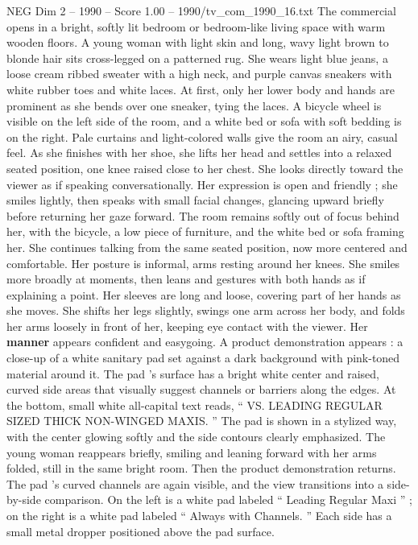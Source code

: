 \begin{textsample}{NEG Dim 2 – 1990 – Score 1.00 – 1990/tv\_com\_1990\_16.txt}  \label{ex:f2_neg_064}
The commercial opens in a bright, softly lit bedroom or bedroom-like living space with warm wooden floors.
A young woman with light skin and long, wavy light brown to blonde hair sits cross-legged on a patterned rug.
She wears light blue jeans, a loose cream ribbed sweater with a high neck, and purple canvas sneakers with white rubber toes and white laces.
At first, only her lower body and hands are prominent as she bends over one sneaker, tying the laces.
A bicycle wheel is visible on the left side of the room, and a white bed or sofa with soft bedding is on the right.
Pale curtains and light-colored walls give the room an airy, casual feel.
As she finishes with her shoe, she lifts her head and settles into a relaxed seated position, one knee raised close to her chest.
She looks directly toward the viewer as if speaking conversationally.
Her expression is open and friendly ; she smiles lightly, then speaks with small facial changes, glancing upward briefly before returning her gaze forward.
The room remains softly out of focus behind her, with the bicycle, a low piece of furniture, and the white bed or sofa framing her.
She continues talking from the same seated position, now more centered and comfortable.
Her posture is informal, arms resting around her knees.
She smiles more broadly at moments, then leans and gestures with both hands as if explaining a point.
Her sleeves are long and loose, covering part of her hands as she moves.
She shifts her legs slightly, swings one arm across her body, and folds her arms loosely in front of her, keeping eye contact with the viewer.
Her \textbf{manner} appears confident and easygoing.
A product demonstration appears : a close-up of a white sanitary pad set against a dark background with pink-toned material around it.
The pad ’s surface has a bright white center and raised, curved side areas that visually suggest channels or barriers along the edges.
At the bottom, small white all-capital text reads, “ VS.
LEADING REGULAR SIZED THICK NON-WINGED MAXIS. ” The pad is shown in a stylized way, with the center glowing softly and the side contours clearly emphasized.
The young woman reappears briefly, smiling and leaning forward with her arms folded, still in the same bright room.
Then the product demonstration returns.
The pad ’s curved channels are again visible, and the view transitions into a side-by-side comparison.
On the left is a white pad labeled “ Leading Regular Maxi ” ; on the right is a white pad labeled “ Always with Channels. ” Each side has a small metal dropper positioned above the pad surface.

\end{textsample}
